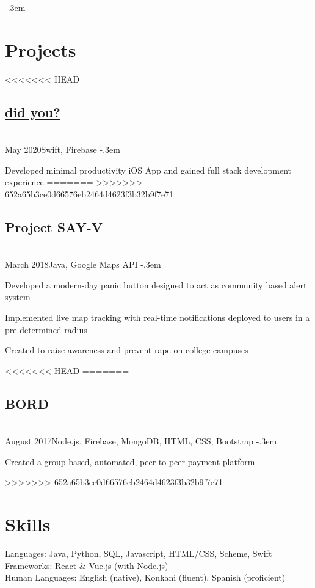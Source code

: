 \documentclass{article}
\let\olditemize=\itemize \let\endolditemize=\enditemize
\renewenvironment{itemize}{\olditemize[topsep=0em] \itemsep-.3em}{\endolditemize}
\newcommand{\entry}[3]{\quad\textbf{#1}\\#2\qquad#3}
\begin{document}
\begin{itemize}
	\section{Projects}
<<<<<<< HEAD
	\subsection{\texorpdfstring{\protect\href{https://github.com/jaykudva/did-you-}{did you?}} ?}
	\entry{}{May 2020}{Swift, Firebase}
	\begin{itemize}
		\item Developed minimal productivity iOS App and gained full stack development experience 
	\end{itemize}
=======
>>>>>>> 652a65b3ce0d66576eb2464d4623f3b32b9f7e71
	\subsection{Project SAY-V}
	\entry{}{March 2018}{Java, Google Maps API}
	\begin{itemize}
		\item Developed a modern-day panic button designed to act as community based alert system
		\item Implemented live map tracking with real-time notifications deployed to users in a pre-determined radius
		\item Created to raise awareness and prevent rape on college campuses
	\end{itemize}
	
<<<<<<< HEAD
=======
	\subsection{BORD}
	\entry{}{August 2017}{Node.js, Firebase, MongoDB, HTML, CSS, Bootstrap}
	\begin{itemize}
		\item Created a group-based, automated, peer-to-peer payment platform
	\end{itemize}
	
	
	
>>>>>>> 652a65b3ce0d66576eb2464d4623f3b32b9f7e71
	\section{Skills}
	Languages:
	Java, Python, SQL, Javascript, HTML/CSS, Scheme, Swift \\
	Frameworks:
	React \& Vue.js (with Node.js) \\
	Human Languages:
	English (native), Konkani (fluent), Spanish (proficient)
	
	
\end{document}
